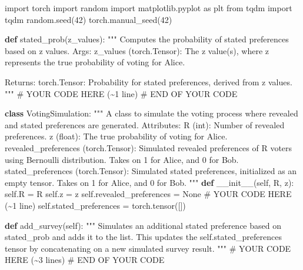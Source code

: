 \documentclass[
  letterpaper,
  DIV=11,
  numbers=noendperiod,
  oneside]{scrreprt}
\newenvironment{Shaded}{\begin{snugshade}}{\end{snugshade}}
\newcommand{\CommentTok}[1]{\textcolor[rgb]{0.37,0.37,0.37}{#1}}
\newcommand{\DecValTok}[1]{\textcolor[rgb]{0.68,0.00,0.00}{#1}}
\newcommand{\FunctionTok}[1]{\textcolor[rgb]{0.28,0.35,0.67}{#1}}
\newcommand{\ImportTok}[1]{\textcolor[rgb]{0.00,0.46,0.62}{#1}}
\newcommand{\KeywordTok}[1]{\textcolor[rgb]{0.00,0.23,0.31}{\textbf{#1}}}
\newcommand{\NormalTok}[1]{\textcolor[rgb]{0.00,0.23,0.31}{#1}}
\newcommand{\OperatorTok}[1]{\textcolor[rgb]{0.37,0.37,0.37}{#1}}
\newcommand{\RegionMarkerTok}[1]{\textcolor[rgb]{0.00,0.23,0.31}{#1}}
\newcommand{\VariableTok}[1]{\textcolor[rgb]{0.07,0.07,0.07}{#1}}
\theoremstyle{remark}
\begin{document}
\begin{Shaded}
\begin{Highlighting}[]
\ImportTok{import}\NormalTok{ torch}
\ImportTok{import}\NormalTok{ random}
\ImportTok{import}\NormalTok{ matplotlib.pyplot }\ImportTok{as}\NormalTok{ plt}
\ImportTok{from}\NormalTok{ tqdm }\ImportTok{import}\NormalTok{ tqdm}
\NormalTok{random.seed(}\DecValTok{42}\NormalTok{)}
\NormalTok{torch.manual\_seed(}\DecValTok{42}\NormalTok{)}

\KeywordTok{def}\NormalTok{ stated\_prob(z\_values):}
    \CommentTok{"""}
\CommentTok{    Computes the probability of stated preferences based on z values.}
\CommentTok{    }
\CommentTok{    Args:}
\CommentTok{        z\_values (torch.Tensor): The z value(s), where z represents the true probability of voting for Alice.}

\CommentTok{    Returns:}
\CommentTok{        torch.Tensor: Probability for stated preferences, derived from z values.}
\CommentTok{    """}
    \CommentTok{\# YOUR CODE HERE (\textasciitilde{}1 line)}
    \CommentTok{\# }\RegionMarkerTok{END}\CommentTok{ OF YOUR CODE}

\KeywordTok{class}\NormalTok{ VotingSimulation:}
    \CommentTok{"""}
\CommentTok{    A class to simulate the voting process where revealed and stated preferences are generated.}
\CommentTok{    }
\CommentTok{    Attributes:}
\CommentTok{        R (int): Number of revealed preferences.}
\CommentTok{        z (float): The true probability of voting for Alice.}
\CommentTok{        revealed\_preferences (torch.Tensor): Simulated revealed preferences of R voters using Bernoulli distribution.}
\CommentTok{                                             Takes on 1 for Alice, and 0 for Bob.}
\CommentTok{        stated\_preferences (torch.Tensor): Simulated stated preferences, initialized as an empty tensor.}
\CommentTok{                                           Takes on 1 for Alice, and 0 for Bob.}
\CommentTok{    """}
    \KeywordTok{def} \FunctionTok{\_\_init\_\_}\NormalTok{(}\VariableTok{self}\NormalTok{, R, z):}
        \VariableTok{self}\NormalTok{.R }\OperatorTok{=}\NormalTok{ R}
        \VariableTok{self}\NormalTok{.z }\OperatorTok{=}\NormalTok{ z}
        \VariableTok{self}\NormalTok{.revealed\_preferences }\OperatorTok{=} \VariableTok{None} \CommentTok{\# YOUR CODE HERE (\textasciitilde{}1 line)}
        \VariableTok{self}\NormalTok{.stated\_preferences }\OperatorTok{=}\NormalTok{ torch.tensor([])}

    \KeywordTok{def}\NormalTok{ add\_survey(}\VariableTok{self}\NormalTok{):}
        \CommentTok{"""}
\CommentTok{        Simulates an additional stated preference based on stated\_prob and adds it to the list.}
\CommentTok{        This updates the self.stated\_preferences tensor by concatenating on a new simulated survey result.}
\CommentTok{        """}
        \CommentTok{\# YOUR CODE HERE (\textasciitilde{}3 lines)}
        \CommentTok{\# }\RegionMarkerTok{END}\CommentTok{ OF YOUR CODE}


\end{Highlighting}
\end{Shaded}
\end{document}
